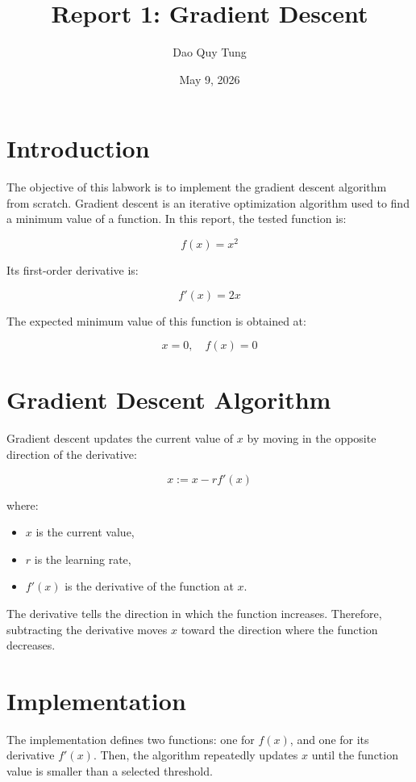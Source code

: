 \documentclass[12pt,a4paper]{article}
\title{Report 1: Gradient Descent}
\author{Dao Quy Tung}
\date{May 9, 2026}
\begin{document}
\maketitle

\section{Introduction}

The objective of this labwork is to implement the gradient descent algorithm from scratch.
Gradient descent is an iterative optimization algorithm used to find a minimum value of a function.
In this report, the tested function is:

\[
f(x) = x^2
\]

Its first-order derivative is:

\[
f'(x) = 2x
\]

The expected minimum value of this function is obtained at:

\[
x = 0, \quad f(x) = 0
\]

\section{Gradient Descent Algorithm}

Gradient descent updates the current value of \(x\) by moving in the opposite direction of the derivative:

\[
x := x - r f'(x)
\]

where:

\begin{itemize}
  \item \(x\) is the current value,
  \item \(r\) is the learning rate,
  \item \(f'(x)\) is the derivative of the function at \(x\).
\end{itemize}

The derivative tells the direction in which the function increases.
Therefore, subtracting the derivative moves \(x\) toward the direction where the function decreases.

\section{Implementation}

The implementation defines two functions: one for \(f(x)\), and one for its derivative \(f'(x)\).
Then, the algorithm repeatedly updates \(x\) until the function value is smaller than a selected threshold.
\end{document}
